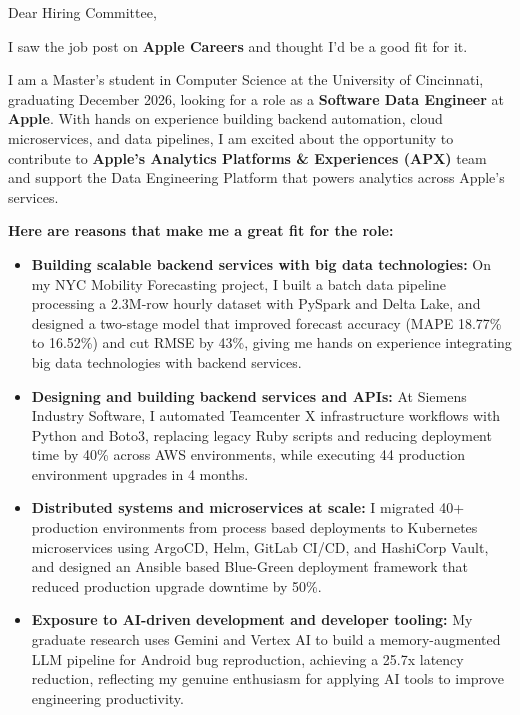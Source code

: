 \documentclass[11pt]{letter}
\date{}
\begin{document}
\begin{letter}{}

\opening{Dear Hiring Committee,}

I saw the job post on \textbf{Apple Careers} and thought I'd be a good fit for it.

I am a Master's student in Computer Science at the University of Cincinnati, graduating December 2026, looking for a role as a \textbf{Software Data Engineer} at \textbf{Apple}. With hands on experience building backend automation, cloud microservices, and data pipelines, I am excited about the opportunity to contribute to \textbf{Apple's Analytics Platforms \& Experiences (APX)} team and support the Data Engineering Platform that powers analytics across Apple's services.

\textbf{Here are reasons that make me a great fit for the role:}

\begin{itemize}[leftmargin=*, itemsep=0.45em]
    \item \textbf{Building scalable backend services with big data technologies:} On my NYC Mobility Forecasting project, I built a batch data pipeline processing a 2.3M-row hourly dataset with PySpark and Delta Lake, and designed a two-stage model that improved forecast accuracy (MAPE 18.77\% to 16.52\%) and cut RMSE by 43\%, giving me hands on experience integrating big data technologies with backend services.

    \item \textbf{Designing and building backend services and APIs:} At Siemens Industry Software, I automated Teamcenter X infrastructure workflows with Python and Boto3, replacing legacy Ruby scripts and reducing deployment time by 40\% across AWS environments, while executing 44 production environment upgrades in 4 months.

    \item \textbf{Distributed systems and microservices at scale:} I migrated 40+ production environments from process based deployments to Kubernetes microservices using ArgoCD, Helm, GitLab CI/CD, and HashiCorp Vault, and designed an Ansible based Blue-Green deployment framework that reduced production upgrade downtime by 50\%.

    \item \textbf{Exposure to AI-driven development and developer tooling:} My graduate research uses Gemini and Vertex AI to build a memory-augmented LLM pipeline for Android bug reproduction, achieving a 25.7x latency reduction, reflecting my genuine enthusiasm for applying AI tools to improve engineering productivity.


\end{itemize}
\end{letter}
\end{document}
